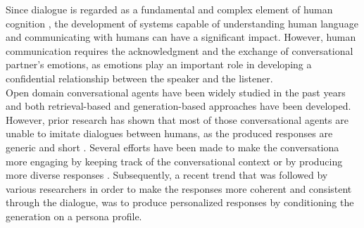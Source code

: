 \documentclass[11pt]{article}
\begin{document}
Since dialogue is regarded as a fundamental and complex element of human cognition \cite{jurafskydialogsystems}, the development of systems capable of understanding human language and communicating with humans can have a significant impact. However, human communication requires the acknowledgment and the exchange of conversational partner's emotions, as emotions play an important role in developing a confidential relationship between the speaker and the listener.
\\Open domain conversational agents have been widely studied in the past years and both retrieval-based and generation-based approaches \citep{wu_2018_context_aware_prototype_editing,cai_2018_retrieval_memory,weston_2018_retrieve_refine} have been developed. However, prior research has shown that most of those  conversational agents are unable to imitate dialogues between humans, as the produced responses are generic and short \citep{vinyals_conv_model,li_2016c_persona_conv_model}. Several efforts have been made to make the conversationa more engaging by keeping track of the conversational context \citep{sordoni-context-sensitive,serban-hierarchical-query,serban-end-to-end-hierarchical,serban-vhred} or by producing more diverse responses \cite{li_diversity_objective_function,li-reinforcement-dialogue}. Subsequently, a recent trend that was followed by various researchers \citep{li_2016c_persona_conv_model,zhang_2018_personachat,kulikov_2018_search_eval_dialog_modeling,joshi_2017_pers,zemlyanskiy_2018_aiming_dialogue,mazare_2018_training,Dinan_2019_convai2,madotto_2019_personalizing_meta_learning,hancock_2019_feed_yourself_chatbot,yavuz_2019_deepcopy,wolf-transfer-transfo-personachat} in order to make the responses more coherent and consistent through the dialogue, was to produce personalized responses by conditioning the generation on a persona profile. %
\\
\end{document}
